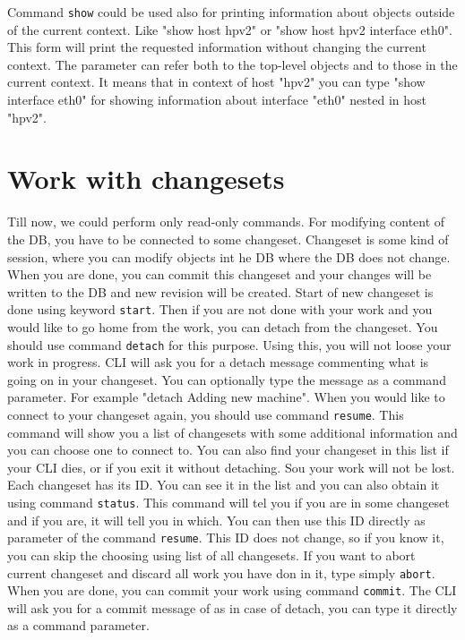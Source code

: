 \documentclass[deska]{subfiles}
\begin{document}
Command {\tt show} could be used also for printing information about objects outside of the current context. Like "show host hpv2" or
"show host hpv2 interface eth0". This form will print the requested information without changing the current context.
The parameter can refer both to the top-level objects and to those in the current context. It means that in context of host "hpv2" you can type "show interface eth0"
for showing information about interface "eth0" nested in host "hpv2".

\section{Work with changesets}

Till now, we could perform only read-only commands. For modifying content of the DB, you have to be connected to some changeset.
Changeset is some kind of session, where you can modify objects int he DB where the DB does not change. When you are done,
you can commit this changeset and your changes will be written to the DB and new revision will be created.
Start of new changeset is done using keyword {\tt start}. Then if you are not done with your work and you would like to
go home from the work, you can detach from the changeset. You should use command {\tt detach} for this purpose. Using
this, you will not loose your work in progress. CLI will ask you for a detach message commenting what is going on in
your changeset. You can optionally type the message as a command parameter. For example "detach Adding new machine".
When you would like to connect to your changeset again, you should use command {\tt resume}. This command will show
you a list of changesets with some additional information and you can choose one to connect to. You can also find your
changeset in this list if your CLI dies, or if you exit it without detaching. Sou your work will not be lost. Each changeset has
its ID. You can see it in the list and you can also obtain it using command {\tt status}. This command will tel you
if you are in some changeset and if you are, it will tell you in which. You can then use this ID directly as parameter
of the command {\tt resume}. This ID does not change, so if you know it, you can skip the choosing using list of
all changesets. If you want to abort current changeset and discard all work you have don in it, type simply {\tt abort}.
When you are done, you can commit your work using command {\tt commit}. The CLI will ask you for a commit message of as
in case of detach, you can type it directly as a command parameter.
\end{document}
